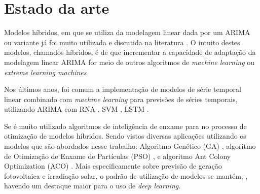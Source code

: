\chapter{Estado da arte}
\label{cap:estado_da_arte}

Modelos híbridos, em que se utiliza da modelagem linear dada por um ARIMA ou variante já foi muito utilizada e discutida na literatura \cite{zhang2003time, khashei2010artificial, babu2014moving, de2014hybrid, de2016hybrid, domingos2019intelligent}. O intuito destes modelos, chamados híbridos, é de que incrementar a capacidade de adaptação da modelagem linear ARIMA for meio de outros algoritmos de \textit{machine learning} ou \textit{extreme learning machines} \cite{yu2020hybrid}

Nos últimos anos, foi comum a implementação de modelos de série temporal linear combinado com \textit{machine learning} para previsões de séries temporais, utilizando ARIMA com RNA \cite{xiong2017hybrid}, SVM \cite{domingos2019intelligent}, LSTM \cite{choi2018stock}.

Se é muito utilizado algoritmos de inteligência de enxame para no processo de otimização de modelos híbridos. Sendo vistos diversas aplicações utilizando os modelos que são abordados nesse trabalho: Algoritmo Genético (GA) \cite{huang2012hybrid}, algoritmo de Otimização de Enxame de Partículas (PSO) \cite{bagheri2014financial, pradeepkumar2017forecasting}, e algoritmo Ant Colony Optimization (ACO) \cite{shen2013optimal}. Mais especificamente sobre previsão de geração fotovoltaica e irradiação solar, o padrão de utilização de modelos se mantém, \cite{sobri2018solar, wang2019review}, havendo um destaque maior para o uso de \textit{deep learning}.